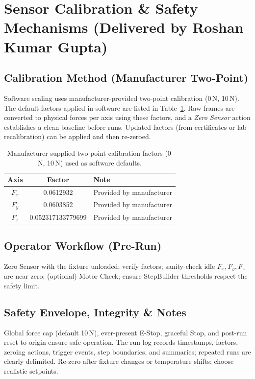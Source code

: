 \documentclass[
    twocolumn,
    fontsize = 10pt,
    parskip = half+,
    headings = small,
    headwidth = text,
    footwidth = text,
]{scrartcl}
\begin{document}

\section{Sensor Calibration \& Safety Mechanisms \textnormal{(Delivered by Roshan Kumar Gupta)}}
\label{sec:calibration}

\subsection{Calibration Method (Manufacturer Two-Point)}
Software scaling uses manufacturer-provided two-point calibration (0\,N, 10\,N). The default factors applied in software are listed in Table~\ref{tab:calibration-factors}. Raw frames are converted to physical forces per axis using these factors, and a \emph{Zero Sensor} action establishes a clean baseline before runs. Updated factors (from certificates or lab recalibration) can be applied and then re-zeroed.

\begin{table}[htbp]
\centering
\caption{Manufacturer-supplied two-point calibration factors (0\,N, 10\,N) used as software defaults.}
\label{tab:calibration-factors}
\begin{tabular}{|c|c|l|}
\hline
\textbf{Axis} & \textbf{Factor} & \textbf{Note} \\
\hline
$F_x$ & 0.0612932 & Provided by manufacturer \\
$F_y$ & 0.0603852 & Provided by manufacturer \\
$F_z$ & 0.052317133779699 & Provided by manufacturer \\
\hline
\end{tabular}
\end{table}


\subsection{Operator Workflow (Pre-Run)}
Zero Sensor with the fixture unloaded; verify factors; sanity-check idle $F_x, F_y, F_z$ are near zero; (optional) Motor Check; ensure StepBuilder thresholds respect the safety limit.

\subsection{Safety Envelope, Integrity \& Notes}
Global force cap (default 10\,N), ever-present E-Stop, graceful Stop, and post-run reset-to-origin ensure safe operation. The run log records timestamps, factors, zeroing actions, trigger events, step boundaries, and summaries; repeated runs are clearly delimited. Re-zero after fixture changes or temperature shifts; choose realistic setpoints.
\end{document}
